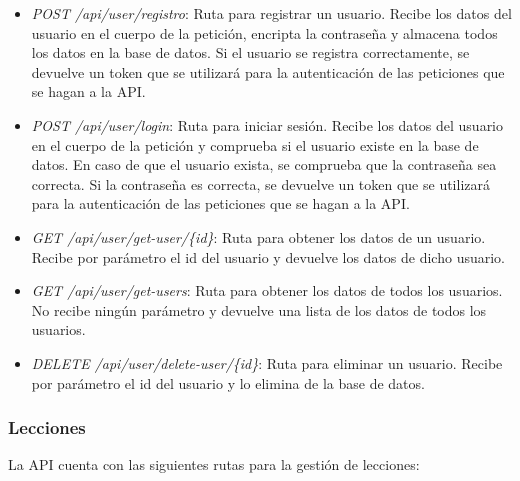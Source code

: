 \begin{itemize}
    \item \textit{POST /api/user/registro}: Ruta para registrar un usuario. Recibe los datos del usuario en el cuerpo de la petición, encripta la contraseña y almacena todos los datos en la base de datos. Si el usuario se registra correctamente, se devuelve un token que se utilizará para la autenticación de las peticiones que se hagan a la API.
    \item \textit{POST /api/user/login}: Ruta para iniciar sesión. Recibe los datos del usuario en el cuerpo de la petición y comprueba si el usuario existe en la base de datos. En caso de que el usuario exista, se comprueba que la contraseña sea correcta. Si la contraseña es correcta, se devuelve un token que se utilizará para la autenticación de las peticiones que se hagan a la API.
    \item \textit{GET /api/user/get-user/\{id\}}: Ruta para obtener los datos de un usuario. Recibe por parámetro el id del usuario y devuelve los datos de dicho usuario.
    \item \textit{GET /api/user/get-users}: Ruta para obtener los datos de todos los usuarios. No recibe ningún parámetro y devuelve una lista de los datos de todos los usuarios.
    \item \textit{DELETE /api/user/delete-user/\{id\}}: Ruta para eliminar un usuario. Recibe por parámetro el id del usuario y lo elimina de la base de datos.
    
\end{itemize}

\subsubsection{Lecciones}
\label{sec:lecciones}
La API cuenta con las siguientes rutas para la gestión de lecciones:

